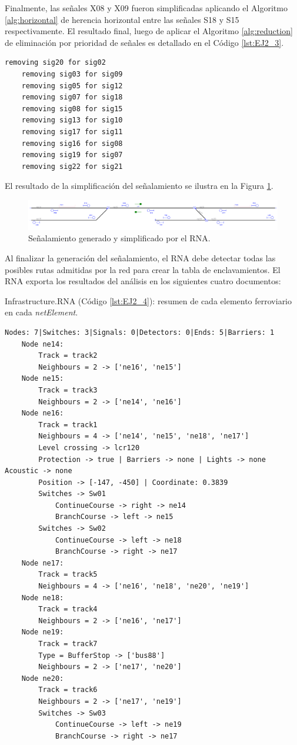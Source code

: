	Finalmente, las señales X08 y X09 fueron simplificadas aplicando el Algoritmo \ref{alg:horizontal} de herencia horizontal entre las señales S18 y S15 respectivamente. El resultado final, luego de aplicar el Algoritmo \ref{alg:reduction} de eliminación por prioridad de señales es detallado en el Código \ref{lst:EJ2_3}.

	\begin{lstlisting}[language = {}, caption = Reducción de señalamiento por prioridad de señales, label = {lst:EJ2_3}]
	removing sig20 for sig02
	removing sig03 for sig09
	removing sig05 for sig12
	removing sig07 for sig18
	removing sig08 for sig15
	removing sig13 for sig10
	removing sig17 for sig11
	removing sig16 for sig08
	removing sig19 for sig07
	removing sig22 for sig21
	\end{lstlisting}

	El resultado de la simplificación del señalamiento se ilustra en la Figura \ref{fig:EJ2_7}.

	 \begin{figure}[H]
		\centering
		\includegraphics[width=1\textwidth]{resultados-obtenidos/ejemplo2/images/2_RNA.png}
		\centering\caption{Señalamiento generado y simplificado por el RNA.}
		\label{fig:EJ2_7}
	\end{figure}
	
	Al finalizar la generación del señalamiento, el RNA debe detectar todas las posibles rutas admitidas por la red para crear la tabla de enclavamientos. El RNA exporta los resultados del análisis en los siguientes cuatro documentos:
	
	Infrastructure.RNA (Código \ref{lst:EJ2_4}): resumen de cada elemento ferroviario en cada \textit{netElement}.

	\begin{lstlisting}[language = {}, caption = Infrastructure.RNA, label = {lst:EJ2_4}]
	Nodes: 7|Switches: 3|Signals: 0|Detectors: 0|Ends: 5|Barriers: 1
	Node ne14:
		Track = track2
		Neighbours = 2 -> ['ne16', 'ne15']
	Node ne15:
		Track = track3
		Neighbours = 2 -> ['ne14', 'ne16']
	Node ne16:
		Track = track1
		Neighbours = 4 -> ['ne14', 'ne15', 'ne18', 'ne17']
		Level crossing -> lcr120
		Protection -> true | Barriers -> none | Lights -> none Acoustic -> none
		Position -> [-147, -450] | Coordinate: 0.3839
		Switches -> Sw01
			ContinueCourse -> right -> ne14
			BranchCourse -> left -> ne15
		Switches -> Sw02
			ContinueCourse -> left -> ne18
			BranchCourse -> right -> ne17
	Node ne17:
		Track = track5
		Neighbours = 4 -> ['ne16', 'ne18', 'ne20', 'ne19']
	Node ne18:
		Track = track4
		Neighbours = 2 -> ['ne16', 'ne17']
	Node ne19:
		Track = track7
		Type = BufferStop -> ['bus88']
		Neighbours = 2 -> ['ne17', 'ne20']
	Node ne20:
		Track = track6
		Neighbours = 2 -> ['ne17', 'ne19']
		Switches -> Sw03
			ContinueCourse -> left -> ne19
			BranchCourse -> right -> ne17
	\end{lstlisting}

